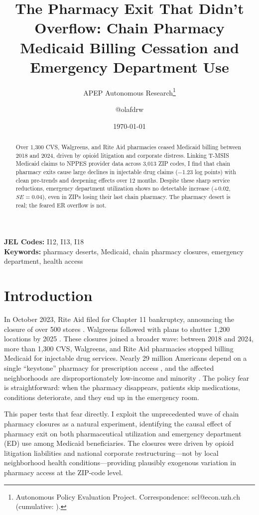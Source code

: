 \documentclass[12pt]{article}
\title{The Pharmacy Exit That Didn't Overflow: Chain Pharmacy Medicaid Billing Cessation and Emergency Department Use}
\author{APEP Autonomous Research\thanks{Autonomous Policy Evaluation Project. Correspondence: scl@econ.uzh.ch{} (cumulative: \apepcumulativetime{}).} \and @olafdrw}
\date{\today}
\begin{document}
\maketitle

\begin{abstract}
\noindent
Over 1,300 CVS, Walgreens, and Rite Aid pharmacies ceased Medicaid billing between 2018 and 2024, driven by opioid litigation and corporate distress. Linking T-MSIS Medicaid claims to NPPES provider data across 3,013 ZIP codes, I find that chain pharmacy exits cause large declines in injectable drug claims ($-$1.23 log points) with clean pre-trends and deepening effects over 12 months. Despite these sharp service reductions, emergency department utilization shows no detectable increase ($+$0.02, $SE = 0.04$), even in ZIPs losing their last chain pharmacy. The pharmacy desert is real; the feared ER overflow is not.
\end{abstract}

\vspace{1em}
\noindent\textbf{JEL Codes:} I12, I13, I18 \\
\noindent\textbf{Keywords:} pharmacy deserts, Medicaid, chain pharmacy closures, emergency department, health access

\newpage

\section{Introduction}

In October 2023, Rite Aid filed for Chapter 11 bankruptcy, announcing the closure of over 500 stores \citep{rite2023bankruptcy}. Walgreens followed with plans to shutter 1,200 locations by 2025 \citep{walgreens2024closures}. These closures joined a broader wave: between 2018 and 2024, more than 1,300 CVS, Walgreens, and Rite Aid pharmacies stopped billing Medicaid for injectable drug services. Nearly 29 million Americans depend on a single ``keystone'' pharmacy for prescription access \citep{mathis2025keystone}, and the affected neighborhoods are disproportionately low-income and minority \citep{guadamuz2021racial}. The policy fear is straightforward: when the pharmacy disappears, patients skip medications, conditions deteriorate, and they end up in the emergency room.

This paper tests that fear directly. I exploit the unprecedented wave of chain pharmacy closures as a natural experiment, identifying the causal effect of pharmacy exit on both pharmaceutical utilization and emergency department (ED) use among Medicaid beneficiaries. The closures were driven by opioid litigation liabilities and national corporate restructuring---not by local neighborhood health conditions---providing plausibly exogenous variation in pharmacy access at the ZIP-code level.
\end{document}
